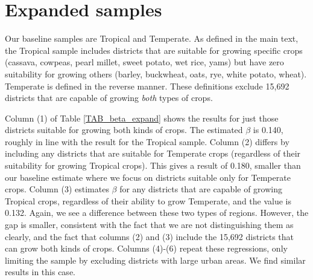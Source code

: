 \documentclass[11pt]{article}
\begin{document}
\section{Expanded samples}
Our baseline samples are Tropical and Temperate. As defined in the main text, the Tropical sample includes districts that are suitable for growing specific crops (cassava, cowpeas, pearl millet, sweet potato, wet rice, yams) but have zero suitability for growing others (barley, buckwheat, oats, rye, white potato, wheat). Temperate is defined in the reverse manner. These definitions exclude 15,692 districts that are capable of growing \textit{both} types of crops. 

Column (1) of Table \ref{TAB_beta_expand} shows the results for just those districts suitable for growing both kinds of crops. The estimated $\beta$ is 0.140, roughly in line with the result for the Tropical sample. Column (2) differs by including any districts that are suitable for Temperate crops (regardless of their suitability for growing Tropical crops). This gives a result of 0.180, smaller than our baseline estimate where we focus on districts suitable only for Temperate crops. Column (3) estimates $\beta$ for any districts that are capable of growing Tropical crops, regardless of their ability to grow Temperate, and the value is 0.132. Again, we see a difference between these two types of regions. However, the gap is smaller, consistent with the fact that we are not distinguishing them as clearly, and the fact that columns (2) and (3) include the 15,692 districts that can grow both kinds of crops. Columns (4)-(6) repeat these regressions, only limiting the sample by excluding districts with large urban areas. We find similar results in this case.
\end{document}
